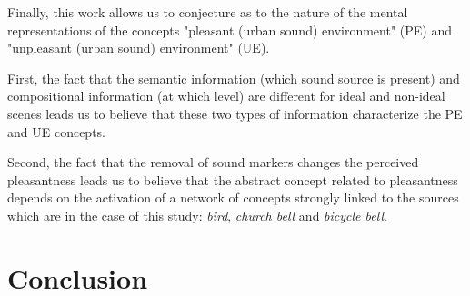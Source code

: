\documentclass[12pt]{elsarticle}
\newcommand{\eg}{\emph{e.\,g.}}
\begin{document}

Finally, this work allows us to conjecture as to the nature of the mental representations of the concepts "pleasant (urban sound) environment" (PE) and "unpleasant (urban sound) environment" (UE).


First, the fact that the semantic information (which sound source is present) and compositional information (at which level) are different for ideal and non-ideal scenes leads us to believe that these two types of information characterize the PE and UE concepts.


Second, the fact that the removal of sound markers changes the perceived pleasantness leads us to believe that the abstract concept related to pleasantness depends on the activation of a network of concepts strongly linked to the sources which are in the case of this study: \emph{bird}, \emph{church bell} and \emph{bicycle bell}.



\section{Conclusion}
\end{document}
